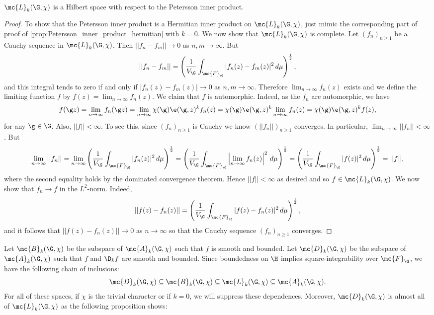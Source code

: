     \begin{proposition}
      $\mc{L}_{k}(\G,\chi)$ is a Hilbert space with respect to the Petersson inner product.
    \end{proposition}
    \begin{proof}
      To show that the Petersson inner product is a Hermitian inner product on $\mc{L}_{k}(\G,\chi)$, just mimic the corresponding part of proof of \cref{prop:Petersson_inner_product_hermitian} with $k = 0$. We now show that $\mc{L}_{k}(\G,\chi)$ is complete. Let $(f_{n})_{n \ge 1}$ be a Cauchy sequence in $\mc{L}_{k}(\G,\chi)$. Then $||f_{n}-f_{m}|| \to 0$ as $n,m \to \infty$. But
      \[
        ||f_{n}-f_{m}|| = \left(\frac{1}{V_{\G}}\int_{\mc{F}_{\G}}|f_{n}(z)-f_{m}(z)|^{2}\,d\mu\right)^{\frac{1}{2}},
      \]
      and this integral tends to zero if and only if $|f_{n}(z)-f_{m}(z)| \to 0$ as $n,m \to \infty$. Therefore $\lim_{n \to \infty}f_{n}(z)$ exists and we define the limiting function $f$ by $f(z) = \lim_{n \to \infty}f_{n}(z)$. We claim that $f$ is automorphic. Indeed, as the $f_{n}$ are automorphic, we have
      \[
        f(\g z) = \lim_{n \to \infty}f_{n}(\g z) = \lim_{n \to \infty}\chi(\g)\e(\g,z)^{k}f_{n}(z) = \chi(\g)\e(\g,z)^{k}\lim_{n \to \infty}f_{n}(z) = \chi(\g)\e(\g,z)^{k}f(z),
      \]
      for any $\g \in \G$. Also, $||f|| < \infty$. To see this, since $(f_{n})_{n \ge 1}$ is Cauchy we know $(||f_{n}||)_{n \ge 1}$ converges. In particular, $\lim_{n \to \infty}||f_{n}|| < \infty$. But
      \[
        \lim_{n \to \infty}||f_{n}|| = \lim_{n \to \infty}\left(\frac{1}{V_{\G}}\int_{\mc{F}_{\G}}|f_{n}(z)|^{2}\,d\mu\right)^{\frac{1}{2}} = \left(\frac{1}{V_{\G}}\int_{\mc{F}_{\G}}\left|\lim_{n \to \infty}f_{n}(z)\right|^{2}\,d\mu\right)^{\frac{1}{2}} = \left(\frac{1}{V_{\G}}\int_{\mc{F}_{\G}}|f(z)|^{2}\,d\mu\right)^{\frac{1}{2}} = ||f||,
      \]
      where the second equality holds by the dominated convergence theorem. Hence $||f|| < \infty$ as desired and so $f \in \mc{L}_{k}(\G,\chi)$. We now show that $f_{n} \to f$ in the $L^{2}$-norm. Indeed,
      \[
        ||f(z)-f_{n}(z)|| = \left(\frac{1}{V_{\G}}\int_{\mc{F}_{\G}}|f(z)-f_{n}(z)|^{2}\,d\mu\right)^{\frac{1}{2}},
      \]
      and it follows that $||f(z)-f_{n}(z)|| \to 0$ as $n \to \infty$ so that the Cauchy sequence $(f_{n})_{n \ge 1}$ converges.
    \end{proof}

    Let $\mc{B}_{k}(\G,\chi)$ be the subspace of $\mc{A}_{k}(\G,\chi)$ such that $f$ is smooth and bounded. Let $\mc{D}_{k}(\G,\chi)$ be the subspace of $\mc{A}_{k}(\G,\chi)$ such that $f$ and $\D_{k}f$ are smooth and bounded. Since boundedness on $\H$ implies square-integrability over $\mc{F}_{\G}$, we have the following chain of inclusions:
    \[
      \mc{D}_{k}(\G,\chi) \subseteq \mc{B}_{k}(\G,\chi) \subseteq \mc{L}_{k}(\G,\chi) \subseteq \mc{A}_{k}(\G,\chi).
    \]
    For all of these spaces, if $\chi$ is the trivial character or if $k = 0$, we will suppress these dependences. Moreover, $\mc{D}_{k}(\G,\chi)$ is almost all of $\mc{L}_{k}(\G,\chi)$ as the following proposition shows:

